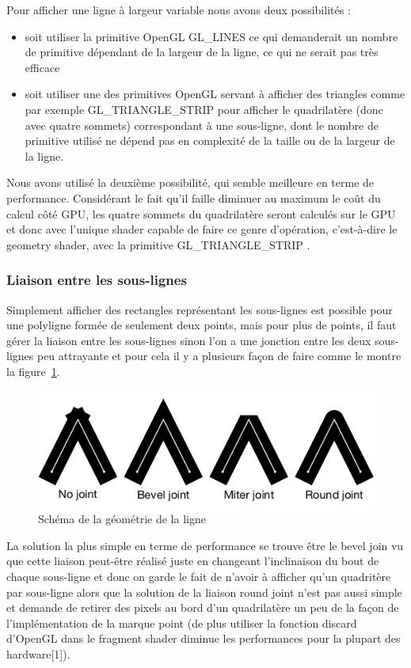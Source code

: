 \documentclass[12pt]{article}
\begin{document}
Pour afficher une ligne à largeur variable nous avons deux possibilités :
\begin{itemize}
\item soit utiliser la primitive OpenGL \og GL\_LINES \fg{} ce qui demanderait un nombre de primitive dépendant de la largeur de la ligne, ce qui ne serait pas très efficace
\item soit utiliser une des primitives OpenGL servant à afficher des triangles comme par exemple \og GL\_TRIANGLE\_STRIP \fg{} pour afficher le quadrilatère (donc avec quatre sommets) correspondant à une sous-ligne, dont le nombre de primitive utilisé ne dépend pas en complexité de la taille ou de la largeur de la ligne.
\end{itemize}

Nous avons utilisé la deuxième possibilité, qui semble meilleure en terme de performance.
Considérant le fait qu’il faille diminuer au maximum le coût du calcul côté GPU, les quatre sommets du quadrilatère seront calculés sur le GPU et donc avec l’unique shader capable de faire ce genre d’opératio­n, c’est-à-dire le geometry shader, avec la primitive \og GL\_TRIANGLE\_STRIP \fg{}.

\subsubsection{Liaison entre les sous-lignes}
Simplement afficher des rectangles représentant les sous-lignes est possible pour une polyligne formée de seulement deux points, mais pour plus de points, il faut gérer la liaison entre les sous-lignes sinon l'on a une jonction entre les deux sous-lignes peu attrayante et pour cela il y a plusieurs façon de faire comme le montre la figure~\ref{fig:joint}.

\begin{figure}[htp]
  \centering
  \includegraphics[scale=0.8]{images/line-joints}
  \caption{Schéma de la géométrie de la ligne}
  \label{fig:joint}
\end{figure}

La solution la plus simple en terme de performance se trouve être le \og bevel join \fg{} vu que cette liaison peut-être réalisé juste en changeant l’inclinaison du bout de chaque sous-ligne et donc on garde le fait de n’avoir à afficher qu’un quadritère par sous-ligne alors que la solution de la liaison  \og round joint \fg{} n’est pas aussi simple et demande de retirer des pixels au bord d’un quadrilatère un peu de la façon de l’implémentation de la marque point (de plus utiliser la fonction discard d’OpenGL dans le fragment shader diminue les performances pour la plupart des hardware[1]).
\end{document}
